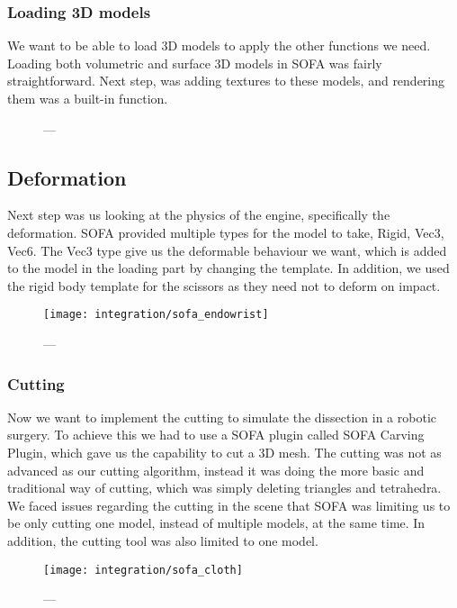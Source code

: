 \subsubsection{Loading 3D models}
We want to be able to load 3D models to apply the other functions we need. Loading both volumetric and surface 3D models in SOFA was fairly straightforward. Next step, was adding textures to these models, and rendering them was a built-in function.

\begin{figure}
  \centering%
  \setlength{\fboxsep}{0pt}%
  \setlength{\fboxrule}{0.1pt}%
  \caption{---}
  \label{fig:sofa_textures}
\end{figure}

\subsection{Deformation}
Next step was us looking at the physics of the engine, specifically the deformation. SOFA provided multiple types for the model to take, Rigid, Vec3, Vec6. The Vec3 type give us the deformable behaviour we want, which is added to the model in the loading part by changing the template. In addition, we used the rigid body template for the scissors as they need not to deform on impact.

\begin{figure}
  \centering%
  \texttt{[image: integration/sofa\_endowrist]}
  \caption{---}
  \label{fig:sofa_endowrist}
\end{figure}

\subsubsection{Cutting}
Now we want to implement the cutting to simulate the dissection in a robotic surgery. To achieve this we had to use a SOFA plugin called SOFA Carving Plugin, which gave us the capability to cut a 3D mesh. The cutting was not as advanced as our cutting algorithm, instead it was doing the more basic and traditional way of cutting, which was simply deleting triangles and tetrahedra. We faced issues regarding the cutting in the scene that SOFA was limiting us to be only cutting one model, instead of multiple models, at the same time. In addition, the cutting tool was also limited to one model.

\begin{figure}
  \centering%
  \texttt{[image: integration/sofa\_cloth]}
  \caption{---}
  \label{fig:sofa_cloth}
\end{figure}

